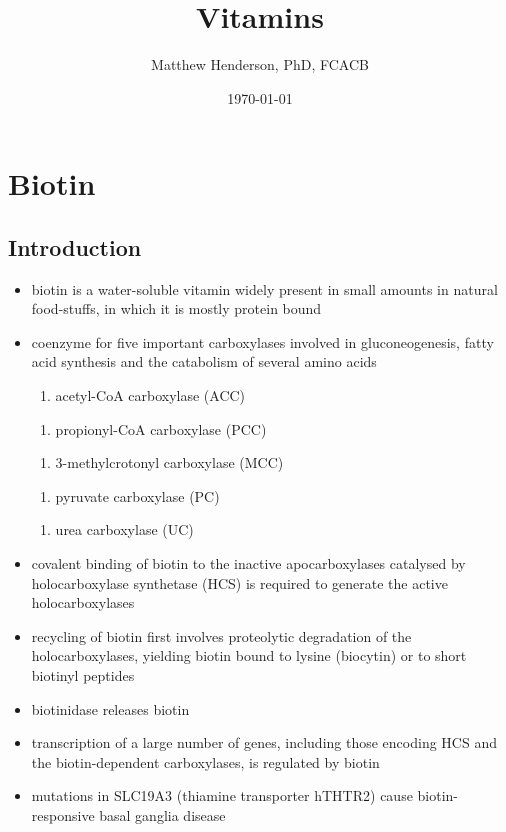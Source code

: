 \documentclass{scrartcl}
\author{Matthew Henderson, PhD, FCACB}
\date{\today}
\title{Vitamins}
\begin{document}
\maketitle
\setcounter{tocdepth}{2}
\tableofcontents


\section{Biotin}
\label{sec:orgcbe9e93}
\subsection{Introduction}
\label{sec:orga312caf}
\begin{itemize}
\item biotin is a water-soluble vitamin widely present in small amounts in
natural food-stuffs, in which it is mostly protein bound
\item coenzyme for five important carboxylases involved in
gluconeogenesis, fatty acid synthesis and the catabolism of several
amino acids
\begin{enumerate}
\item acetyl-CoA carboxylase (ACC)
\end{enumerate}
\begin{enumerate}
\item propionyl-CoA carboxylase (PCC)
\end{enumerate}
\begin{enumerate}
\item 3-methylcrotonyl carboxylase (MCC)
\end{enumerate}
\begin{enumerate}
\item pyruvate carboxylase (PC)
\end{enumerate}
\begin{enumerate}
\item urea carboxylase (UC)
\end{enumerate}

\item covalent binding of biotin to the inactive apocarboxylases
catalysed by holocarboxylase synthetase (HCS) is required to
generate the active holocarboxylases
\item recycling of biotin first involves proteolytic degradation of the
holocarboxylases, yielding biotin bound to lysine (biocytin) or to
short biotinyl peptides
\item biotinidase releases biotin
\item transcription of a large number of genes, including those encoding
HCS and the biotin-dependent carboxylases, is regulated by biotin
\item mutations in SLC19A3 (thiamine transporter hTHTR2) cause
biotin-responsive basal ganglia disease
\end{itemize}
\end{document}

